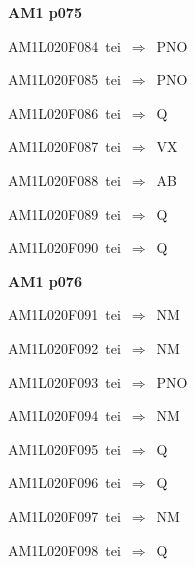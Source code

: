 \par\vfill\eject
{\bf\hfill AM1 p075\hfill\hbox{}}\par\bigskip
{\sixrm AM1L020F084\ {\sixit tei}\ }$\Rightarrow$\ PNO\par\smallskip
{\sixrm AM1L020F085\ {\sixit tei}\ }$\Rightarrow$\ PNO\par\smallskip
{\sixrm AM1L020F086\ {\sixit tei}\ }$\Rightarrow$\ Q\par\smallskip
{\sixrm AM1L020F087\ {\sixit tei}\ }$\Rightarrow$\ VX\par\smallskip
{\sixrm AM1L020F088\ {\sixit tei}\ }$\Rightarrow$\ AB\par\smallskip
{\sixrm AM1L020F089\ {\sixit tei}\ }$\Rightarrow$\ Q\par\smallskip
{\sixrm AM1L020F090\ {\sixit tei}\ }$\Rightarrow$\ Q\par\smallskip

\par\vfill\eject
{\bf\hfill AM1 p076\hfill\hbox{}}\par\bigskip
{\sixrm AM1L020F091\ {\sixit tei}\ }$\Rightarrow$\ NM\par\smallskip
{\sixrm AM1L020F092\ {\sixit tei}\ }$\Rightarrow$\ NM\par\smallskip
{\sixrm AM1L020F093\ {\sixit tei}\ }$\Rightarrow$\ PNO\par\smallskip
{\sixrm AM1L020F094\ {\sixit tei}\ }$\Rightarrow$\ NM\par\smallskip
{\sixrm AM1L020F095\ {\sixit tei}\ }$\Rightarrow$\ Q\par\smallskip
{\sixrm AM1L020F096\ {\sixit tei}\ }$\Rightarrow$\ Q\par\smallskip
{\sixrm AM1L020F097\ {\sixit tei}\ }$\Rightarrow$\ NM\par\smallskip
{\sixrm AM1L020F098\ {\sixit tei}\ }$\Rightarrow$\ Q\par\smallskip

